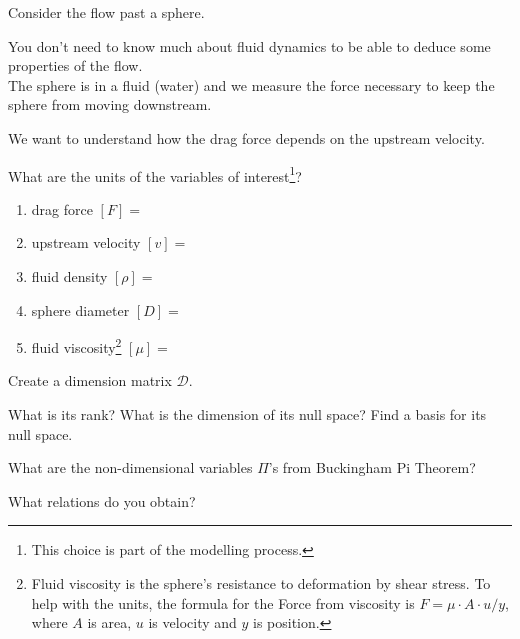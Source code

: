 \begin{slide}

\question

\begin{problem}

Consider the flow past a sphere.

\begin{center}
\end{center}

You don't need to know much about fluid dynamics to be able to deduce some properties of the flow. \\

The sphere is in a fluid (water) and we measure the force necessary to keep the sphere from moving downstream.

We want to understand how the drag force depends on the upstream velocity.
\end{problem}

\begin{parts}
	\item What are the units of the variables of interest\footnote{This choice is part of the modelling process.}?
	\begin{enumerate}
		\item drag force $[F]=$
		\item upstream velocity $[v]=$
		\item fluid density $[\rho]=$
		\item sphere diameter $[D]=$
		\item fluid viscosity\footnote{Fluid viscosity is the sphere's resistance to deformation by shear stress. To help with the units, the formula for the Force from viscosity is $F =\mu \cdot A \cdot u/y$, where $A$ is area, $u$ is velocity and $y$ is position.} $[\mu]= $
	\end{enumerate}
	\item Create a dimension matrix $\mathcal{D}$.
	\item What is its rank? What is the dimension of its null space? Find a basis for its null space.
	\item What are the non-dimensional variables $\Pi$'s from Buckingham Pi Theorem?
	\item What relations do you obtain?
		
\end{parts}
	
\end{slide}


